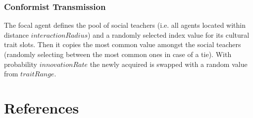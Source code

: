 \documentclass[11pt,a4paper,twocolumn,notitlepage]{article}
\begin{document}
\subsubsection{Conformist Transmission}

The focal agent defines the pool of social teachers (i.e. all agents located within distance $interactionRadius$) and a randomly selected index value for its cultural trait slots. Then it copies the most common value amongst the social teachers (randomly selecting between the most common ones in case of a tie). With probability $innovationRate$ the newly acquired is swapped with a random value from $traitRange$.

\section{References}


\end{document}
